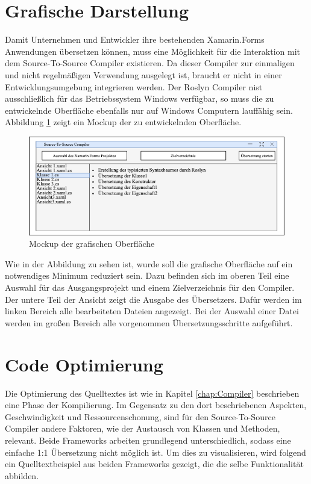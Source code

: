 \section{Grafische Darstellung}
Damit Unternehmen und Entwickler ihre bestehenden Xamarin.Forms Anwendungen übersetzen können, muss eine Möglichkeit für die Interaktion mit dem Source-To-Source Compiler existieren.  Da dieser Compiler zur einmaligen und nicht regelmäßigen Verwendung ausgelegt ist,  braucht er nicht in einer Entwicklungsumgebung integrieren werden.  Der Roslyn Compiler nist ausschließlich für das  Betriebssystem Windows verfügbar,  so muss die zu entwickelnde Oberfläche ebenfalls nur auf Windows Computern lauffähig sein.  Abbildung \ref{fig:UiMockup} zeigt ein Mockup der zu entwickelnden Oberfläche. 

\begin{figure}[!ht]
 \includegraphics[width=\textwidth,keepaspectratio]{Images/CompilerArchitecture/Mockup.png}
 \caption{Mockup der grafischen Oberfläche}
 \label{fig:UiMockup}
\end{figure}

Wie in der Abbildung zu sehen ist,  wurde soll die grafische Oberfläche auf ein notwendiges Minimum reduziert sein.  Dazu befinden sich im oberen Teil eine Auswahl für das Ausgangsprojekt und einem Zielverzeichnis für den Compiler.  Der untere Teil der Ansicht zeigt die Ausgabe des Übersetzers.  Dafür werden im linken Bereich alle bearbeiteten Dateien angezeigt.  Bei der Auswahl einer Datei werden im großen Bereich alle vorgenommen Übersetzungsschritte aufgeführt.

\section{Code Optimierung}
Die Optimierung des Quelltextes ist wie in Kapitel \ref{chap:Compiler}  beschrieben eine Phase der Kompilierung.  Im Gegensatz zu den dort beschriebenen Aspekten, Geschwindigkeit und Ressourcenschonung,  sind für den Source-To-Source Compiler andere Faktoren, wie der Austausch von Klassen und Methoden,  relevant.  Beide Frameworks arbeiten grundlegend unterschiedlich,  sodass eine einfache 1:1 Übersetzung nicht möglich ist.  Um dies zu visualisieren, wird folgend ein Quelltextbeispiel aus beiden Frameworks gezeigt,  die die selbe Funktionalität abbilden.


